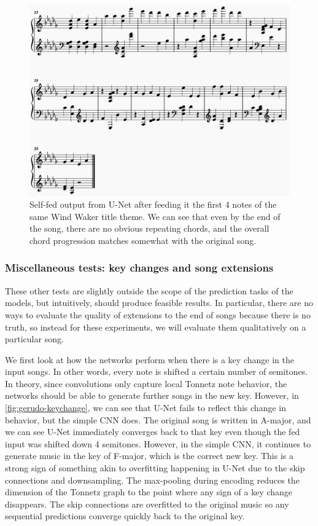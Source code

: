 \documentclass[
	a4paper, %
	10pt, %
	unnumberedsections, %
	twoside, %
]{LTJournalArticle}
\begin{document}
\begin{figure}
    \centering
    \includegraphics[width=\linewidth]{images/windwaker-unet.png}
    \caption{Self-fed output from U-Net after feeding it the first 4 notes of the same Wind Waker title theme. We can see that even by the end of the song, there are no obvious repeating chords, and the overall chord progression matches somewhat with the original song.}
    \label{fig:unet-norepeat}
\end{figure}

\subsubsection{Miscellaneous tests: key changes and song extensions}

These other tests are slightly outside the scope of the prediction tasks of the models, but intuitively, should produce feasible results. In particular, there are no ways to evaluate the quality of extensions to the end of songs because there is no truth, so instead for these experiments, we will evaluate them qualitatively on a particular song.

We first look at how the networks perform when there is a key change in the input songs. In other words, every note is shifted a certain number of semitones. In theory, since convolutions only capture local Tonnetz note behavior, the networks should be able to generate further songs in the new key. However, in \autoref{fig:gerudo-keychange}, we can see that U-Net fails to reflect this change in behavior, but the simple CNN does. The original song is written in A-major, and we can see U-Net immediately converges back to that key even though the fed input was shifted down 4 semitones. However, in the simple CNN, it continues to generate music in the key of F-major, which is the correct new key. This is a strong sign of something akin to overfitting happening in U-Net due to the skip connections and downsampling. The max-pooling during encoding reduces the dimension of the Tonnetz graph to the point where any sign of a key change disappears. The skip connections are overfitted to the original music so any sequential predictions converge quickly back to the original key.
\end{document}
